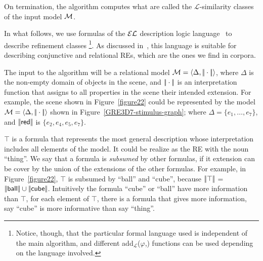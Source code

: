 On termination, the algorithm computes what are called the
$\mathcal{L}$-similarity classes of the input model $\mathcal{M}$.


In what follows, we use formulas of the $\mathcal{EL}$ description logic
language~\cite{baad:desc03} to describe refinement classes
\footnote{Notice, though, that the particular formal language used is
  independent of the main algorithm, and different
  add$_{\mathcal{L}}$($\varphi$,\RE) functions can be used depending
  on the language involved.}.  As discussed
in~\cite{arec2:2008:Areces}, this language is suitable for describing
conjunctive and relational REs, which are the ones we find in corpora.

 The input to the algorithm will be a relational model $\mathcal{M} =
 \langle \Delta, |\!|\cdot|\!| \rangle$, where $\Delta$ is the non-empty domain
 of objects in the scene, and $|\!|\cdot|\!|$ is an interpretation
 function that assigns to all properties in the scene their intended
 extension.  For example, the scene shown in Figure~\ref{figure22}
 could be represented by the model $\mathcal{M}=\langle \Delta,|\!|\cdot|\!| \rangle$
 shown in Figure~\ref{GRE3D7-stimulus-graph}; where $\Delta =
 \{e_1,\ldots,e_7\}$, and $|\!|\textsf{red}|\!|$ is $\{e_2, e_4, e_5,
 e_7\}$.

$\top$ is a formula that represents the most general description whose
interpretation includes all elements of the model. It could be realize
as the RE with the noun ``\textsf{thing}''. We say that a formula is
\emph{subsumed} by other formulas, if it extension can be cover by the
union of the extensions of the other formulas. For example, in
Figure~\ref{figure22}, $\top$ is subsumed by ``\textsf{ball}'' and
``\textsf{cube}'', because $|\!|\top|\!|$ = $|\!|\textsf{ball}|\!|
\cup |\!|\textsf{cube}|\!|$.
Intuitively the formula ``\textsf{cube}'' or ``\textsf{ball}'' have more information than $\top$, for each element of $\top$, there is a formula that gives more information, say ``\textsf{cube}'' is more informative than say ``\textsf{thing}''.\\

